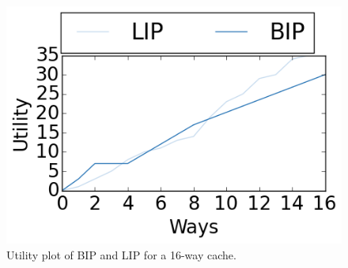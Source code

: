 \begin{figure}[ht]
    \centering
    \includegraphics[width=.65\textwidth]{figures/algorithms/clu-utility}
    \caption{Utility plot of BIP and LIP for a 16-way cache.}
    \label{fig:algorithms:lru_example}
\end{figure}

